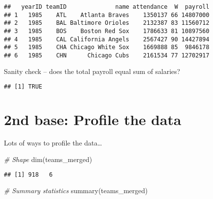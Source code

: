 \documentclass[
]{article}
\newenvironment{Shaded}{\begin{snugshade}}{\end{snugshade}}
\newcommand{\CommentTok}[1]{\textcolor[rgb]{0.56,0.35,0.01}{\textit{#1}}}
\newcommand{\FunctionTok}[1]{\textcolor[rgb]{0.00,0.00,0.00}{#1}}
\newcommand{\NormalTok}[1]{#1}
\newcommand{\SpecialCharTok}[1]{\textcolor[rgb]{0.00,0.00,0.00}{#1}}
\begin{document}
\begin{verbatim}
##   yearID teamID              name attendance  W  payroll
## 1   1985    ATL    Atlanta Braves    1350137 66 14807000
## 2   1985    BAL Baltimore Orioles    2132387 83 11560712
## 3   1985    BOS    Boston Red Sox    1786633 81 10897560
## 4   1985    CAL California Angels    2567427 90 14427894
## 5   1985    CHA Chicago White Sox    1669888 85  9846178
## 6   1985    CHN      Chicago Cubs    2161534 77 12702917
\end{verbatim}

Sanity check -- does the total payroll equal sum of salaries?

\begin{Shaded}
\end{Shaded}

\begin{verbatim}
## [1] TRUE
\end{verbatim}

\hypertarget{nd-base-profile-the-data}{%
\section{2nd base: Profile the data}\label{nd-base-profile-the-data}}

Lots of ways to profile the data\ldots{}

\begin{Shaded}
\begin{Highlighting}[]
\CommentTok{\# Shape}
\FunctionTok{dim}\NormalTok{(teams\_merged)}
\end{Highlighting}
\end{Shaded}

\begin{verbatim}
## [1] 918   6
\end{verbatim}

\begin{Shaded}
\begin{Highlighting}[]
\CommentTok{\# Summary statistics}
\FunctionTok{summary}\NormalTok{(teams\_merged)}
\end{Highlighting}
\end{Shaded}
\end{document}
